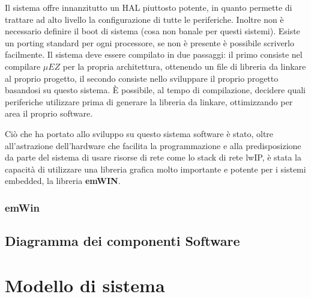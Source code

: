 \documentclass[a4paper,titlepage]{book}
\begin{document}
Il sistema offre innanzitutto un HAL piuttosto potente, in quanto permette di trattare ad alto livello la configurazione di tutte le periferiche. Inoltre non è necessario definire il boot di sistema (cosa non banale per questi sistemi). Esiste un porting standard per ogni processore, se non è presente è possibile scriverlo facilmente. Il sistema deve essere compilato in due passaggi: il primo consiste nel compilare $\mu EZ$ per la propria architettura, ottenendo un file di libreria da linkare al proprio progetto, il secondo consiste nello sviluppare il proprio progetto basandosi su questo sistema. È possibile, al tempo di compilazione, decidere quali periferiche utilizzare prima di generare la libreria da linkare, ottimizzando per area il proprio software.




Ciò che ha portato allo sviluppo su questo sistema software è stato, oltre all'astrazione dell'hardware che facilita la programmazione e alla predisposizione da parte del sistema di usare risorse di rete come lo stack di rete lwIP, è stata la capacità di utilizzare una libreria grafica molto importante e potente per i sistemi embedded, la libreria \textbf{emWIN}.

\subsection{emWin}





\section{Diagramma dei componenti Software}


\chapter{Modello di sistema}
\end{document}
